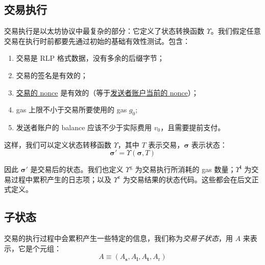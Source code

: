 \documentclass[9pt,oneside]{amsart}
\begin{document}
\begin{multicols}{2}

\section{交易执行} \label{ch:transactions}

交易执行是以太坊协议中最复杂的部分：它定义了状态转换函数 \hyperlink{Upsilon_state_transition}{$\Upsilon$}。我们假定任意交易在执行时前都要先通过初始的基础有效性测试。包含：

\begin{enumerate}
\item 交易是 RLP 格式数据，没有多余的后缀字节；
\item 交易的签名是有效的；
\item \hyperlink{transaction_nonce}{交易的 nonce} 是有效的（等于\hyperlink{account_nonce}{发送者账户当前的 nonce}）；
\item gas 上限不小于交易所要使用的 gas $g_0$;
\item 发送者账户的 balance 应该不少于实际费用 $v_0$，且需要提前支付。
\end{enumerate}

这样，我们可以定义状态转移函数 \hyperlink{Upsilon_state_transition}{$\Upsilon$}，其中 $T$ 表示交易，$\boldsymbol{\sigma}$ 表示状态：
\begin{equation}
\boldsymbol{\sigma}' = \Upsilon(\boldsymbol{\sigma}, T)
\end{equation}

因此 $\boldsymbol{\sigma}'$ 是交易后的状态。我们也定义 \hyperlink{tx_total_gas_used_Upsilon_pow_g}{$\Upsilon^{\mathrm{g}}$} 为交易执行所消耗的 gas 数量；\hyperlink{tx_logs_Upsilon_pow_l}{$\Upsilon^{\mathbf{l}}$} 为交易过程中累积产生的日志项；以及 \hyperlink{tx_status_Upsilon_pow_z}{$\Upsilon^{\mathrm{z}}$} 为交易结果的状态代码。这些都会在后文正式定义。

\subsection{子状态}
交易的执行过程中会累积产生一些特定的信息，我们称为\textit{交易子状态}，用 $A$ 来表示，它是个元组：
\begin{equation}
A \equiv (A_{\mathbf{s}}, A_{\mathbf{l}}, A_{\mathbf{t}}, A_{\mathrm{r}})
\end{equation}


\end{multicols}
\end{document}
